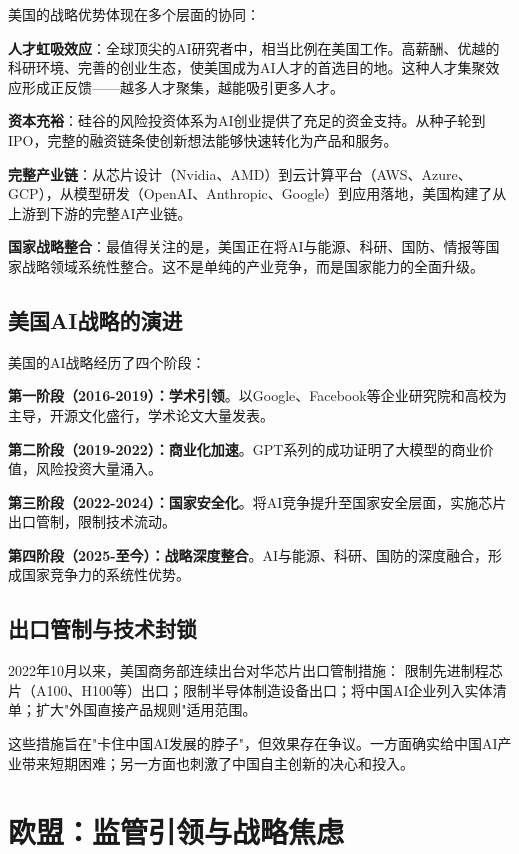 美国的战略优势体现在多个层面的协同：

\textbf{人才虹吸效应}：全球顶尖的AI研究者中，相当比例在美国工作。高薪酬、优越的科研环境、完善的创业生态，使美国成为AI人才的首选目的地。这种人才集聚效应形成正反馈——越多人才聚集，越能吸引更多人才。

\textbf{资本充裕}：硅谷的风险投资体系为AI创业提供了充足的资金支持。从种子轮到IPO，完整的融资链条使创新想法能够快速转化为产品和服务。

\textbf{完整产业链}：从芯片设计（Nvidia、AMD）到云计算平台（AWS、Azure、GCP），从模型研发（OpenAI、Anthropic、Google）到应用落地，美国构建了从上游到下游的完整AI产业链。

\textbf{国家战略整合}：最值得关注的是，美国正在将AI与能源、科研、国防、情报等国家战略领域系统性整合。这不是单纯的产业竞争，而是国家能力的全面升级。

\subsection{美国AI战略的演进}

美国的AI战略经历了四个阶段：

\textbf{第一阶段（2016-2019）：学术引领}。以Google、Facebook等企业研究院和高校为主导，开源文化盛行，学术论文大量发表。

\textbf{第二阶段（2019-2022）：商业化加速}。GPT系列的成功证明了大模型的商业价值，风险投资大量涌入。

\textbf{第三阶段（2022-2024）：国家安全化}。将AI竞争提升至国家安全层面，实施芯片出口管制，限制技术流动。

\textbf{第四阶段（2025-至今）：战略深度整合}。AI与能源、科研、国防的深度融合，形成国家竞争力的系统性优势。

\subsection{出口管制与技术封锁}

2022年10月以来，美国商务部连续出台对华芯片出口管制措施：
限制先进制程芯片（A100、H100等）出口；限制半导体制造设备出口；将中国AI企业列入实体清单；扩大"外国直接产品规则"适用范围。

这些措施旨在"卡住中国AI发展的脖子"，但效果存在争议。一方面确实给中国AI产业带来短期困难；另一方面也刺激了中国自主创新的决心和投入。

\section{欧盟：监管引领与战略焦虑}

